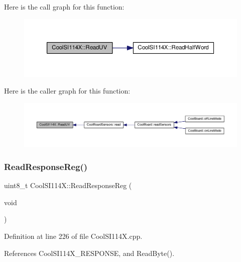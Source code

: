 Here is the call graph for this function\+:\nopagebreak
\begin{figure}[H]
\begin{center}
\leavevmode
\includegraphics[width=350pt]{dd/d67/class_cool_s_i114_x_a14ced664d74e93438440b0274109c111_cgraph}
\end{center}
\end{figure}
Here is the caller graph for this function\+:\nopagebreak
\begin{figure}[H]
\begin{center}
\leavevmode
\includegraphics[width=350pt]{dd/d67/class_cool_s_i114_x_a14ced664d74e93438440b0274109c111_icgraph}
\end{center}
\end{figure}
\mbox{\label{class_cool_s_i114_x_a869d3825147831d707f7ef324a665646}} 
\subsubsection{\texorpdfstring{Read\+Response\+Reg()}{ReadResponseReg()}}
{\footnotesize\ttfamily uint8\+\_\+t Cool\+S\+I114\+X\+::\+Read\+Response\+Reg (\begin{DoxyParamCaption}\item[{void}]{ }\end{DoxyParamCaption})}



Definition at line 226 of file Cool\+S\+I114\+X.\+cpp.



References Cool\+S\+I114\+X\+\_\+\+R\+E\+S\+P\+O\+N\+SE, and Read\+Byte().



